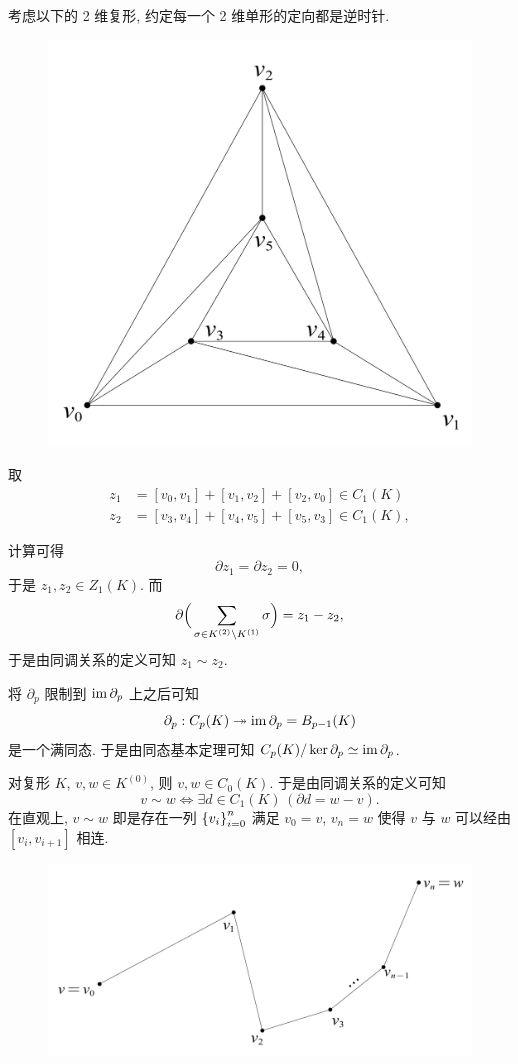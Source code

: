     \begin{Example}
        考虑以下的 2 维复形, 约定每一个 2 维单形的定向都是逆时针.
		\begin{figure}[htbp]
			\centering
        	\includegraphics[width=0.3\linewidth]{figures/Sec3-4.png}
		\end{figure}

		取
    	\[
    	        \begin{aligned}
    	            z_1&=[v_0,v_1]+[v_1,v_2]+[v_2,v_0]\in C_1(K)\\
    	            z_2&=[v_3,v_4]+[v_4,v_5]+[v_5,v_3]\in C_1(K),
    	        \end{aligned}
    	\]
    
    	计算可得
    	\[
    	        \partial z_1=\partial z_2=0,
    	\]
    	于是 $ z_1,z_2\in Z_1(K) $. 而
    	\[
    	    \partial\Big(\sum_{\sigma\in K^{(2)}\setminus K^{(1)}}\sigma\Big)=z_1-z_2, 
    	\]
    	于是由同调关系的定义可知 $ z_1\sim z_2 $.
    \end{Example}

	将 $ \partial_p $ 限制到 $ \mathrm{im}\,\partial_p $ 上之后可知
    \[
        \partial_p : C_p(K)\twoheadrightarrow\mathrm{im}\,\partial_p=B_{p-1}(K)
    \]
    是一个满同态. 于是由同态基本定理可知 $ C_p(K)/\ker\partial_p\simeq\mathrm{im}\,\partial_p $.~

    对复形 $ K $, $ v,w\in K^{(0)} $, 则 $ v,w\in C_0(K) $. 于是由同调关系的定义可知
    \[
        v\sim w\Longleftrightarrow\exists d\in C_1(K)\,(\partial d=w-v).
    \]
    在直观上, $ v\sim w $ 即是存在一列 $ \left\{ v_i \right\}_{i=0}^n $ 满足 $ v_0=v $, $ v_n=w $ 使得 $ v $ 与 $ w $ 可以经由 $ [v_i,v_{i+1}] $ 相连.

    \begin{figure}
        \centering
        \includegraphics[width=0.4\linewidth]{figures/Sec3-5.png}
    \end{figure}

